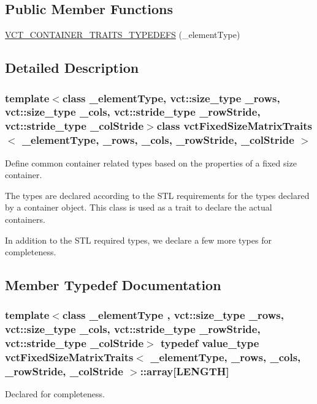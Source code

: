\subsection*{Public Member Functions}
\begin{DoxyCompactItemize}
\item 
\hyperlink{classvct_fixed_size_matrix_traits_a9ac65f0b7d8723c8e13b131e6941096b}{V\+C\+T\+\_\+\+C\+O\+N\+T\+A\+I\+N\+E\+R\+\_\+\+T\+R\+A\+I\+T\+S\+\_\+\+T\+Y\+P\+E\+D\+E\+F\+S} (\+\_\+element\+Type)
\end{DoxyCompactItemize}


\subsection{Detailed Description}
\subsubsection*{template$<$class \+\_\+element\+Type, vct\+::size\+\_\+type \+\_\+rows, vct\+::size\+\_\+type \+\_\+cols, vct\+::stride\+\_\+type \+\_\+row\+Stride, vct\+::stride\+\_\+type \+\_\+col\+Stride$>$class vct\+Fixed\+Size\+Matrix\+Traits$<$ \+\_\+element\+Type, \+\_\+rows, \+\_\+cols, \+\_\+row\+Stride, \+\_\+col\+Stride $>$}

Define common container related types based on the properties of a fixed size container. 

The types are declared according to the S\+T\+L requirements for the types declared by a container object. This class is used as a trait to declare the actual containers.

In addition to the S\+T\+L required types, we declare a few more types for completeness. 

\subsection{Member Typedef Documentation}
\hypertarget{classvct_fixed_size_matrix_traits_a3894b24d65c8d4b54d17192001d28dc2}{}
\subsubsection[{array}]{\setlength{\rightskip}{0pt plus 5cm}template$<$class \+\_\+element\+Type , vct\+::size\+\_\+type \+\_\+rows, vct\+::size\+\_\+type \+\_\+cols, vct\+::stride\+\_\+type \+\_\+row\+Stride, vct\+::stride\+\_\+type \+\_\+col\+Stride$>$ typedef value\+\_\+type {\bf vct\+Fixed\+Size\+Matrix\+Traits}$<$ \+\_\+element\+Type, \+\_\+rows, \+\_\+cols, \+\_\+row\+Stride, \+\_\+col\+Stride $>$\+::array\mbox{[}{\bf L\+E\+N\+G\+T\+H}\mbox{]}}\label{classvct_fixed_size_matrix_traits_a3894b24d65c8d4b54d17192001d28dc2}
Declared for completeness. \hypertarget{classvct_fixed_size_matrix_traits_ac7459b07165b6f472e2f5238cc069b55}{}
